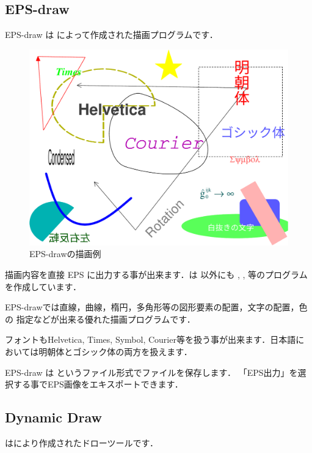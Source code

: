 \subsection{EPS-draw}

EPS-draw は によって作成された描画プログラムです．

\begin{figure}
 \centering
 \includegraphics[scale=.4]{images/EPSdraw-crop}
 \caption{EPS-drawの描画例}
\end{figure}

描画内容を直接 EPS に出力する事が出来ます．は
 以外にも , ,
等のプログラムを作成しています．

EPS-drawでは直線，曲線，楕円，多角形等の図形要素の配置，文字の配置，色の
指定などが出来る優れた描画プログラムです．

フォントもHelvetica, Times, Symbol, Courier等を扱う事が出来ます．日本語に
おいては明朝体とゴシック体の両方を扱えます．

EPS-draw は というファイル形式でファイルを保存します．
「EPS出力」を選択する事でEPS画像をエキスポートできます．



\subsection{Dynamic Draw}

はにより作成されたドローツールです．

